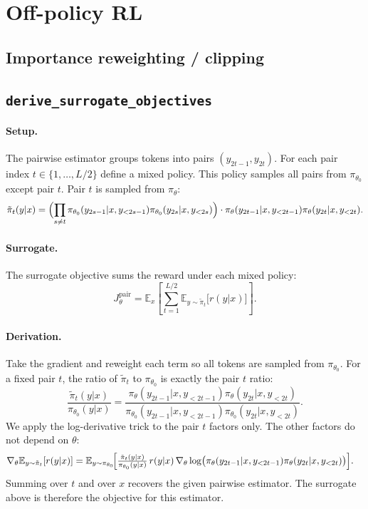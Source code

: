 \documentclass[11pt]{article}
\newcommand{\E}{\mathbb{E}}
\newcommand{\policy}{\pi_\theta}
\newcommand{\policyold}{\pi_{\theta_0}}
\newcommand{\problemid}[1]{\subsection*{\nolinkurl{#1}}}
\begin{document}
\section{Off-policy RL}

\subsection{Importance reweighting / clipping}

\problemid{derive_surrogate_objectives}

\paragraph{Setup.} The pairwise estimator groups tokens into pairs
$(y_{2t-1}, y_{2t})$. For each pair index $t \in \{1, \dots, L/2\}$ define a
mixed policy. This policy samples all pairs from $\policyold$ except pair $t$.
Pair $t$ is sampled from $\policy$:
\[
\tilde\pi_t(y|x) =
\Bigl(\prod_{s\neq t}\policyold(y_{2s-1}|x,y_{<2s-1})\policyold(y_{2s}|x,y_{<2s})\Bigr)
\cdot \policy(y_{2t-1}|x,y_{<2t-1})\policy(y_{2t}|x,y_{<2t}).
\]

\paragraph{Surrogate.} The surrogate objective sums the reward under each
mixed policy:
\[
\boxed{\;J^{\text{pair}}_\theta = \E_{x}\!\left[\sum_{t=1}^{L/2}\E_{y\sim\tilde\pi_t}\!\bigl[r(y|x)\bigr]\right].\;}
\]

\paragraph{Derivation.} Take the gradient and reweight each term so all
tokens are sampled from $\policyold$. For a fixed pair $t$, the ratio of
$\tilde\pi_t$ to $\policyold$ is exactly the pair $t$ ratio:
\[
\frac{\tilde\pi_t(y|x)}{\policyold(y|x)}
= \frac{\policy(y_{2t-1}|x,y_{<2t-1})\policy(y_{2t}|x,y_{<2t})}{\policyold(y_{2t-1}|x,y_{<2t-1})\policyold(y_{2t}|x,y_{<2t})}.
\]
We apply the log-derivative trick to the pair $t$ factors only. The other
factors do not depend on $\theta$:
\begin{align*}
\nabla_\theta \E_{y\sim\tilde\pi_t}[r(y|x)]
&= \E_{y\sim\policyold}\!\Bigl[\tfrac{\tilde\pi_t(y|x)}{\policyold(y|x)}\,r(y|x)\,\nabla_\theta\log\bigl(\policy(y_{2t-1}|x,y_{<2t-1})\policy(y_{2t}|x,y_{<2t})\bigr)\Bigr].
\end{align*}
Summing over $t$ and over $x$ recovers the given pairwise estimator. The
surrogate above is therefore the objective for this estimator.
\end{document}
